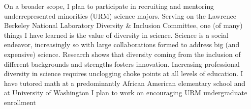 \documentclass[12pt]{article}
\newcommand{\where}{University of Washington}
\newcommand{\where}{University of Michigan}
\begin{document}
On a broader scope, I plan to participate in recruiting and mentoring underrepresented minorities (URM) science majors.
Serving on the Lawrence Berkeley National Laboratory Diversity \& Inclusion Committee, one (of many) things I have
learned is the value of diversity in science.  Science is a social endeavor, increasingly so with
 large collaborations formed to address big (and expensive) science.  Research shows that diversity
coming  from the inclusion of different  backgrounds and strengths fosters innovation.  Increasing professional
diversity in science requires
unclogging choke points at all levels of education.  I have tutored math at a predominantly African American
elementary school and at  \where{} I plan to work on encouraging URM undergraduate enrollment  \iftoggle{UW}{through the
Office of Minority Affairs \& Diversity Recruitment and Outreach.}{as a
mentor in the Michigan Louis Stokes Alliance for Minority Participation.}
\end{document}
